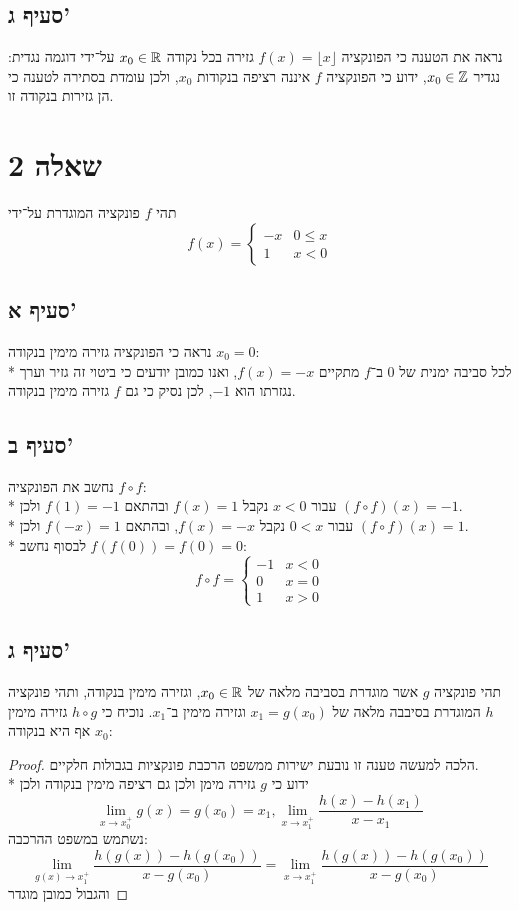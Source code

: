 \subsection{סעיף ג'}
נראה את הטענה כי הפונקציה $f(x) = \lfloor x \rfloor$ גזירה בכל נקודה $x_0 \in \mathbb{R}$ על־ידי דוגמה נגדית:
נגדיר $x_0 \in \mathbb{Z}$, ידוע כי הפונקציה $f$ איננה רציפה בנקודות $x_0$, ולכן עומדת בסתירה לטענה כי הן גזירות בנקודה זו.

\section{שאלה 2}
תהי $f$ פונקציה המוגדרת על־ידי
\[
	f(x) = \begin{cases}
		-x & 0 \le x \\
		1 & x < 0
	\end{cases}
\]

\subsection{סעיף א'}
נראה כי הפונקציה גזירה מימין בנקודה $x_0 = 0$: \\*
לכל סביבה ימנית של $0$ ב־$f$ מתקיים $f(x) = -x$, ואנו כמובן יודעים כי ביטוי זה גזיר וערך נגזרתו הוא $-1$, לכן נסיק כי גם $f$ גזירה מימין בנקודה.

\subsection{סעיף ב'}
נחשב את הפונקציה $f \circ f$: \\*
עבור $x < 0$ נקבל $f(x) = 1$ ובהתאם $f(1) = -1$ ולכן $(f \circ f)(x) = -1$. \\*
עבור $0 < x$ נקבל $f(x) = -x$, ובהתאם $f(-x) = 1$ ולכן $(f \circ f)(x) = 1$. \\*
לבסוף נחשב $f(f(0)) = f(0) = 0$:
\[
	f \circ f = \begin{cases}
		-1 & x < 0 \\
		0 & x = 0 \\
		1 & x > 0
	\end{cases}
\]

\subsection{סעיף ג'}
תהי פונקציה $g$ אשר מוגדרת בסביבה מלאה של $x_0 \in \mathbb{R}$, וגזירה מימין בנקודה, ותהי פונקציה $h$ המוגדרת בסיבבה מלאה של $x_1 = g(x_0)$ וגזירה מימין ב־$x_1$.
נוכיח כי $h \circ g$ גזירה מימין אף היא בנקודה $x_0$:
\begin{proof}
	הלכה למעשה טענה זו נובעת ישירות ממשפט הרכבת פונקציות בגבולות חלקיים. \\*
	ידוע כי $g$ גזירה מימן ולכן גם רציפה מימין בנקודה ולכן
	\[
		\lim_{x \to x_0^+} g(x) = g(x_0) = x_1,
		\lim_{x \to x_1^+} \frac{h(x) - h(x_1)}{x - x_1}
	\]
	נשתמש במשפט ההרכבה:
	\[
		\lim_{g(x) \to x_1^+} \frac{h(g(x)) - h(g(x_0))}{x - g(x_0)}
		= \lim_{x \to x_1^+} \frac{h(g(x)) - h(g(x_0))}{x - g(x_0)}
	\]
	והגבול כמובן מוגדר
\end{proof}

